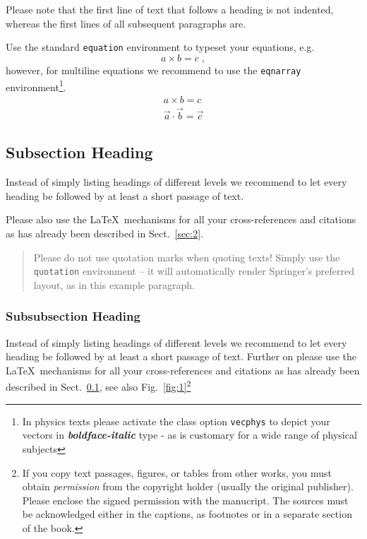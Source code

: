 \documentclass[graybox]{svmult}
\begin{document}
Please note that the first line of text that follows a heading is not indented, whereas the first lines of all subsequent paragraphs are.

Use the standard \verb|equation| environment to typeset your equations, e.g.
%
\begin{equation}
a \times b = c\;,
\end{equation}
%
however, for multiline equations we recommend to use the \verb|eqnarray| environment\footnote{In physics texts please activate the class option \texttt{vecphys} to depict your vectors in \textbf{\itshape boldface-italic} type - as is customary for a wide range of physical subjects}.
\begin{eqnarray}
a \times b = c \nonumber\\
\vec{a} \cdot \vec{b}=\vec{c}
\label{eq:01}
\end{eqnarray}

\subsection{Subsection Heading}
\label{subsec:2}
Instead of simply listing headings of different levels we recommend to
let every heading be followed by at least a short passage of text.

Please also use the \LaTeX\ mechanisms for all your
cross-references and citations
as has already been described in Sect.~\ref{sec:2}.

\begin{quotation}
Please do not use quotation marks when quoting texts! Simply use the \verb|quotation|
environment -- it will automatically render Springer's preferred layout, as in this
example paragraph.
\end{quotation}


\subsubsection{Subsubsection Heading}
Instead of simply listing headings of different levels we recommend to
let every heading be followed by at least a short passage of text.
Further on please use the \LaTeX\ mechanisms for all your
cross-references and citations as has already been described in
Sect.~\ref{subsec:2}, see also Fig.~\ref{fig:1}\footnote{If you copy
text passages, figures, or tables from other works, you must obtain
\textit{permission} from the copyright holder (usually the original
publisher). Please enclose the signed permission with the manucript. The
sources must be acknowledged either in the
captions, as footnotes or in a separate section of the book.}
\end{document}
